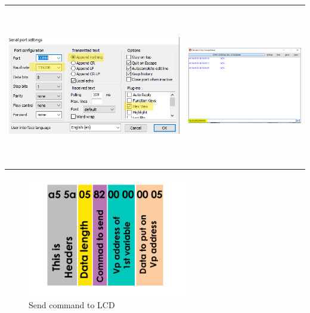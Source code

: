 \documentclass[12pt, A4]{article} %
\begin{document}
\begin{center}
\begin{tabular}{ c c }
\includegraphics[width=9cm , height=7cm]{termite} & \includegraphics[width=6cm , height=7cm]{termiteWindow}
    \end{tabular}
\end{center}
\begin{figure}[!htb] %
	\centering
	\includegraphics[width=7cm]{sendCommand} 
	\caption{Send command to LCD\\}
\end{figure}

\newpage
\end{document}
